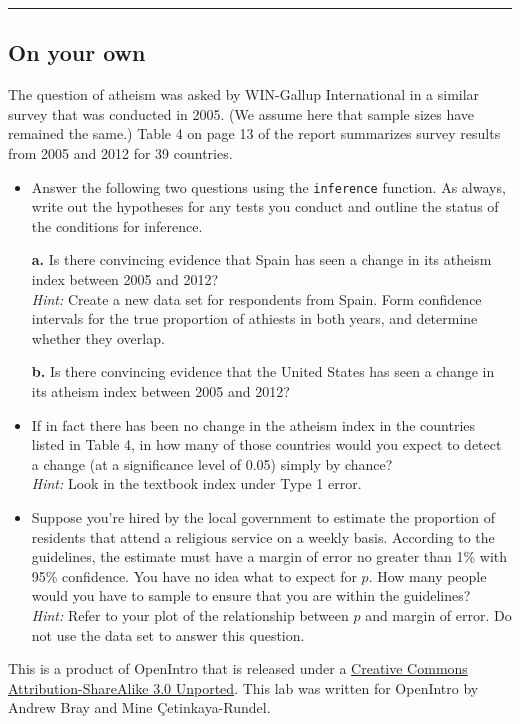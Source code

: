 \documentclass[
]{article}
\begin{document}
\begin{center}\rule{0.5\linewidth}{0.5pt}\end{center}

\hypertarget{on-your-own}{%
\subsection{On your own}\label{on-your-own}}

The question of atheism was asked by WIN-Gallup International in a
similar survey that was conducted in 2005. (We assume here that sample
sizes have remained the same.) Table 4 on page 13 of the report
summarizes survey results from 2005 and 2012 for 39 countries.

\begin{itemize}
\item
  Answer the following two questions using the \texttt{inference}
  function. As always, write out the hypotheses for any tests you
  conduct and outline the status of the conditions for inference.

  \textbf{a.} Is there convincing evidence that Spain has seen a change
  in its atheism index between 2005 and 2012?\\
  \emph{Hint:} Create a new data set for respondents from Spain. Form
  confidence intervals for the true proportion of athiests in both
  years, and determine whether they overlap.

  \textbf{b.} Is there convincing evidence that the United States has
  seen a change in its atheism index between 2005 and 2012?
\item
  If in fact there has been no change in the atheism index in the
  countries listed in Table 4, in how many of those countries would you
  expect to detect a change (at a significance level of 0.05) simply by
  chance?\\
  \emph{Hint:} Look in the textbook index under Type 1 error.
\item
  Suppose you're hired by the local government to estimate the
  proportion of residents that attend a religious service on a weekly
  basis. According to the guidelines, the estimate must have a margin of
  error no greater than 1\% with 95\% confidence. You have no idea what
  to expect for \(p\). How many people would you have to sample to
  ensure that you are within the guidelines?\\
  \emph{Hint:} Refer to your plot of the relationship between \(p\) and
  margin of error. Do not use the data set to answer this question.
\end{itemize}

\leavevmode{}%
This is a product of OpenIntro that is released under a
\href{http://creativecommons.org/licenses/by-sa/3.0}{Creative Commons
Attribution-ShareAlike 3.0 Unported}. This lab was written for OpenIntro
by Andrew Bray and Mine Çetinkaya-Rundel.
\end{document}
